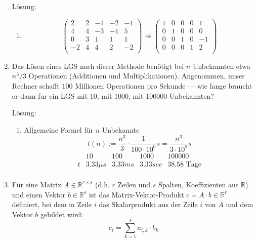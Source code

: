 \documentclass[main.tex]{subfiles}
\begin{document}
\begin{enumerate}
	      Lösung:
	      \begin{enumerate}
		      \item \[
			            \begin{pmatrix}
				            2  & 2 & -1 & -2 & -1 \\
				            4  & 4 & -3 & -1 & 5  \\
				            0  & 3 & 1  & 1  & 1  \\
				            -2 & 4 & 4  & 2  & -2 \\
			            \end{pmatrix}
			            \rightsquigarrow
			            \begin{pmatrix}
				            1 & 0 & 0 & 0 & 1  \\
				            0 & 1 & 0 & 0 & 0  \\
				            0 & 0 & 1 & 0 & -1 \\
				            0 & 0 & 0 & 1 & 2  \\
			            \end{pmatrix}
		            \]
	      \end{enumerate}
	\item Das Lösen eines LGS nach dieser Methode benötigt bei \( n \) Unbekannten etwa
	      \( n^3/3 \) Operationen (Additionen und Multiplikationen). Angenommen, unser
	      Rechner schafft \( 100 \) Millionen Operationen pro Sekunde — wie lange braucht
	      er dann fur ein LGS mit \( 10 \), mit \( 1000 \), mit \( 100000 \) Unbekannten?

	      Lösung:
	      \begin{enumerate}
		      \item Allgemeine Formel für \( n \) Unbekannte
		            \[ t(n) := \frac{n^3}{3} \cdot \frac{1}{100 \cdot 10^6} s
			            = \frac{n^3 }{3 \cdot 10^{8}}  s\]
		            \[ \begin{array}{ccccc}
				              & 10         & 100     & 1 000    & 100 000            \\
				            \hline
				            t & 3.33 \mu s & 3.33 ms & 3.33 sec & 38.58 \text{ Tage} \\
			            \end{array} \]
	      \end{enumerate}
	\item Für eine Matrix \( A \in \mathbb{R}^{ r \times s } \) (d.h. \( r \) Zeilen und \( s \)
	      Spalten, Koeffizienten aus
	      \( \mathbb{R} \)) und einen Vektor \( b \in \mathbb{R}^s \) ist das Matrix-Vektor-Produkt
	      \( c = A \cdot b \in \mathbb{R}^r \) definiert, bei dem in Zeile \( i \) das Skalarprodukt
	      aus der Zeile \( i \) von \( A \) und dem Vektor \( b \) gebildet wird:
	      \[ c_i = \sum_{ k = 1 }^{s} a_{i,k} \cdot b_k \]


\end{enumerate}
\end{document}
